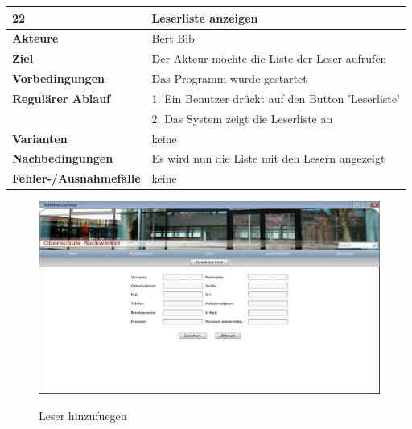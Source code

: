 \documentclass[fontsize=12pt,paper=a4,twoside]{scrartcl}
\begin{document}
\begin{table}[htbp]
\label{22}
\begin{tabular}{|l|p{10cm}|}
\hline 
\textbf{22} & \textbf{Leserliste anzeigen} \\ \hline
\textbf{Akteure} & Bert Bib\\ \hline
\textbf{Ziel} & Der Akteur möchte die Liste der Leser aufrufen  \\ \hline
\textbf{Vorbedingungen} & Das Programm wurde gestartet  \\ \hline
\textbf{Regulärer Ablauf} & 
1. Ein Benutzer drückt auf den Button 'Leserliste' \\
&2. Das System zeigt die Leserliste an\\
\hline
\textbf{Varianten} & 
keine \\ \hline
\textbf{Nachbedingungen} & Es wird nun die Liste mit den Lesern angezeigt \\ \hline
\textbf{Fehler-/Ausnahmefälle} & keine\\
\hline
\end{tabular}
\end{table}

\begin{figure}[htbp]
\caption{Leser hinzufuegen}
\includegraphics[width=1\textwidth]{ScreensWebsite/LeserHinzufuegen.png}
  \label{Leser hinzufuegen}
\end{figure}
\end{document}
